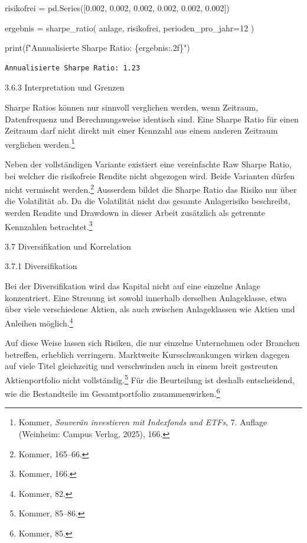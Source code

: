 \documentclass[
  ngerman,
  a4paper,
  DIV=11,
  oneside]{scrreprt}
\newenvironment{Shaded}{\begin{snugshade}}{\end{snugshade}}
\newcommand{\BuiltInTok}[1]{\textcolor[rgb]{0.00,0.23,0.31}{#1}}
\newcommand{\DecValTok}[1]{\textcolor[rgb]{0.68,0.00,0.00}{#1}}
\newcommand{\FloatTok}[1]{\textcolor[rgb]{0.68,0.00,0.00}{#1}}
\newcommand{\NormalTok}[1]{\textcolor[rgb]{0.00,0.23,0.31}{#1}}
\newcommand{\OperatorTok}[1]{\textcolor[rgb]{0.37,0.37,0.37}{#1}}
\newcommand{\SpecialCharTok}[1]{\textcolor[rgb]{0.37,0.37,0.37}{#1}}
\newcommand{\SpecialStringTok}[1]{\textcolor[rgb]{0.13,0.47,0.30}{#1}}
\begin{document}
\begin{Shaded}
\begin{Highlighting}[]
\NormalTok{risikofrei }\OperatorTok{=}\NormalTok{ pd.Series([}\FloatTok{0.002}\NormalTok{, }\FloatTok{0.002}\NormalTok{, }\FloatTok{0.002}\NormalTok{, }\FloatTok{0.002}\NormalTok{, }\FloatTok{0.002}\NormalTok{, }\FloatTok{0.002}\NormalTok{])}

\NormalTok{ergebnis }\OperatorTok{=}\NormalTok{ sharpe\_ratio(}
\NormalTok{    anlage,}
\NormalTok{    risikofrei,}
\NormalTok{    perioden\_pro\_jahr}\OperatorTok{=}\DecValTok{12}
\NormalTok{)}

\BuiltInTok{print}\NormalTok{(}\SpecialStringTok{f"Annualisierte Sharpe Ratio: }\SpecialCharTok{\{}\NormalTok{ergebnis}\SpecialCharTok{:.2f\}}\SpecialStringTok{"}\NormalTok{)}
\end{Highlighting}
\end{Shaded}

\begin{verbatim}
Annualisierte Sharpe Ratio: 1.23
\end{verbatim}

3.6.3 Interpretation und Grenzen

Sharpe Ratios können nur sinnvoll verglichen werden, wenn Zeitraum,
Datenfrequenz und Berechnungsweise identisch sind. Eine Sharpe Ratio für
einen Zeitraum darf nicht direkt mit einer Kennzahl aus einem anderen
Zeitraum verglichen werden.\footnote{Kommer, \emph{Souverän investieren
  mit Indexfonds und ETFs}, 7. Auflage (Weinheim: Campus Verlag, 2025),
  166.}

Neben der vollständigen Variante existiert eine vereinfachte Raw Sharpe
Ratio, bei welcher die risikofreie Rendite nicht abgezogen wird. Beide
Varianten dürfen nicht vermischt werden.\footnote{Kommer, 165--66.}
Ausserdem bildet die Sharpe Ratio das Risiko nur über die Volatilität
ab. Da die Volatilität nicht das gesamte Anlagerisiko beschreibt, werden
Rendite und Drawdown in dieser Arbeit zusätzlich als getrennte
Kennzahlen betrachtet.\footnote{Kommer, 166.}

3.7 Diversifikation und Korrelation

3.7.1 Diversifikation

Bei der Diversifikation wird das Kapital nicht auf eine einzelne Anlage
konzentriert. Eine Streuung ist sowohl innerhalb derselben Anlageklasse,
etwa über viele verschiedene Aktien, als auch zwischen Anlageklassen wie
Aktien und Anleihen möglich.\footnote{Kommer, 82.}

Auf diese Weise lassen sich Risiken, die nur einzelne Unternehmen oder
Branchen betreffen, erheblich verringern. Marktweite Kursschwankungen
wirken dagegen auf viele Titel gleichzeitig und verschwinden auch in
einem breit gestreuten Aktienportfolio nicht vollständig.\footnote{Kommer,
  85--86.} Für die Beurteilung ist deshalb entscheidend, wie die
Bestandteile im Gesamtportfolio zusammenwirken.\footnote{Kommer, 85.}
\end{document}
